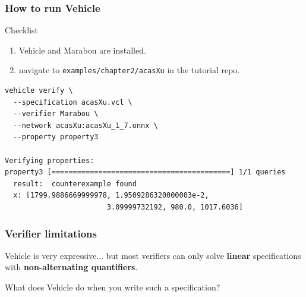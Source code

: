 \documentclass[t,compress,aspectratio=169]{beamer}
\begin{document}
\begin{frame}[fragile]
\frametitle{How to run Vehicle}
\vspace{-2em}
\begin{block}{Checklist}
\begin{enumerate}
\item Vehicle and Marabou are installed.
\item navigate to \texttt{examples/chapter2/acasXu} in the tutorial repo.
\end{enumerate}
\end{block}

\pause
\begin{verbatim}
vehicle verify \
  --specification acasXu.vcl \
  --verifier Marabou \
  --network acasXu:acasXu_1_7.onnx \
  --property property3

Verifying properties:
property3 [==========================================] 1/1 queries
  result:  counterexample found
  x: [1799.9886669999978, 1.9509286320000003e-2,
                        3.09999732192, 980.0, 1017.6036]
\end{verbatim}
\end{frame}




\begin{frame}
\frametitle{Verifier limitations}

Vehicle is very expressive... \pause but most verifiers can only solve \textbf{linear} specifications with \textbf{non-alternating quantifiers}.

\pause
\vspace{1em}

What does Vehicle do when you write such a specification?
\end{frame}
\end{document}
